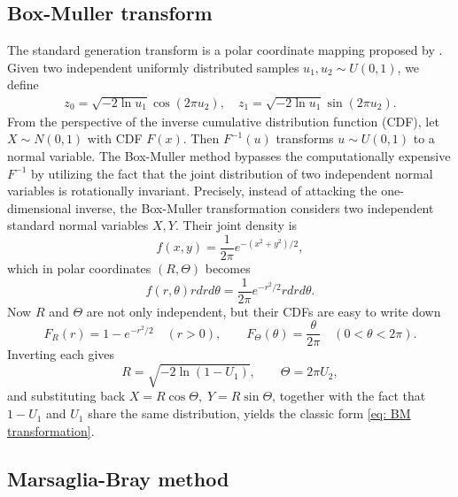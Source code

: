 \documentclass{amsart}
\theoremstyle{definition}
\numberwithin{equation}{section}
\begin{document}
\subsection{Box-Muller transform}


The standard generation transform is a polar coordinate mapping proposed by \cite{box1958note}. Given two independent uniformly distributed samples $u_1, u_2 \sim U(0, 1)$, we define
\begin{eqnarray}
    z_0 = \sqrt{-2 \ln u_1} \cos(2\pi u_2), \quad 
    z_1 = \sqrt{-2 \ln u_1} \sin(2\pi u_2). \label{eq: BM transformation}
\end{eqnarray}
From the perspective of the inverse cumulative distribution function (CDF), let $X \sim N(0,1)$ with CDF $F(x)$. Then $F^{-1}(u)$ transforms $u \sim U(0,1)$ to a normal variable. The Box-Muller method bypasses the computationally expensive $F^{-1}$ by utilizing the fact that the joint distribution of two independent normal variables is rotationally invariant. Precisely, instead of attacking the one-dimensional inverse, the Box-Muller transformation considers two independent standard normal variables \(X,Y\). Their joint density is
\[
f(x,y)=\frac{1}{2\pi}e^{-(x^2+y^2)/2},
\]
which in polar coordinates \((R,\Theta)\) becomes
\[
f(r,\theta) r dr d\theta = \frac{1}{2\pi}e^{-r^2/2}r dr d\theta .
\]
Now \(R\) and \(\varTheta\) are not only independent, but their CDFs are easy to write down
\[
F_R(r)=1-e^{-r^2/2}\quad(r>0),\qquad
F_\varTheta(\theta)=\frac{\theta}{2\pi}\quad(0<\theta<2\pi).
\]
Inverting each gives
\[
R=\sqrt{-2\ln(1-U_1)},\qquad \Theta=2\pi U_2,
\]
and substituting back \(X=R\cos\varTheta,\;Y=R\sin\varTheta\), together with the fact that \(1-U_1\) and \(U_1\) share the same distribution, yields the classic form \eqref{eq: BM transformation}.


\subsection{Marsaglia-Bray method}
\end{document}
